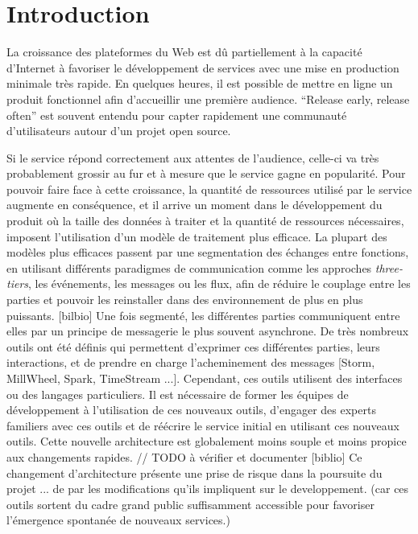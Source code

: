 \section{Introduction}

La croissance des plateformes du Web est dû partiellement à la capacité d'Internet à favoriser le développement de services avec une mise en production minimale très rapide.
En quelques heures, il est possible de mettre en ligne un produit fonctionnel afin d'accueillir une première audience.
``Release early, release often'' est souvent entendu pour capter rapidement une communauté d'utilisateurs autour d'un projet open source.

Si le service répond correctement aux attentes de l'audience, celle-ci va très probablement grossir au fur et à mesure que le service gagne en popularité.
Pour pouvoir faire face à cette croissance, la quantité de ressources utilisé par le service augmente en conséquence, et il arrive un moment dans le développement du produit où la taille des données à traiter et la quantité de ressources nécessaires, imposent l'utilisation d'un modèle de traitement plus efficace.
La plupart des modèles plus efficaces passent par une segmentation des échanges entre fonctions, en utilisant différents paradigmes de communication comme les approches \textit{three-tiers}, les événements, les messages ou les flux, afin de réduire le couplage entre les parties et pouvoir les reinstaller dans des environnement de plus en plus puissants. [bilbio]
Une fois segmenté, les différentes parties communiquent entre elles par un principe de messagerie le plus souvent asynchrone.
De très nombreux outils ont été définis qui permettent d'exprimer ces différentes parties, leurs interactions, et de prendre en charge l'acheminement des messages [Storm, MillWheel, Spark, TimeStream ...].
Cependant, ces outils utilisent des interfaces ou des langages particuliers. Il est nécessaire de former les équipes de développement à l'utilisation de ces nouveaux outils, d'engager des experts familiers avec ces outils et de réécrire le service initial en utilisant ces nouveaux outils.
Cette nouvelle architecture est globalement moins souple et moins propice aux changements rapides. // TODO à vérifier et documenter [biblio]
Ce changement d'architecture présente une prise de risque dans la poursuite du projet ... de par les modifications qu'ils impliquent sur le developpement.
(car ces outils sortent du cadre grand public suffisamment accessible pour favoriser l'émergence spontanée de nouveaux services.)

